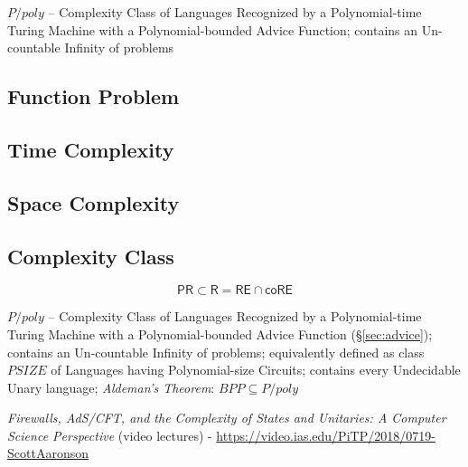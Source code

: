 $P/poly$ -- Complexity Class of Languages Recognized by a Polynomial-time Turing
Machine with a Polynomial-bounded Advice Function; contains an Un-countable
Infinity of problems



\subsection{Function Problem}\label{sec:function_problem}

\subsection{Time Complexity}\label{sec:time_complexity}

\subsection{Space Complexity}\label{sec:space_complexity}

\subsection{Complexity Class}\label{sec:complexity_class}

\[
  \mathsf{PR} \subset \mathsf{R} = \mathsf{RE} \cap \mathsf{coRE}
\]

$P/poly$ -- Complexity Class of Languages Recognized by a Polynomial-time Turing
Machine with a Polynomial-bounded Advice Function (\S\ref{sec:advice}); contains
an Un-countable Infinity of problems; equivalently defined as class $PSIZE$ of
Languages having Polynomial-size Circuits; contains every Undecidable Unary
language; \emph{Aldeman's Theorem}: $BPP \subseteq P/poly$

\emph{Firewalls, AdS/CFT, and the Complexity of States and Unitaries: A Computer
  Science Perspective}
(video lectures)
-
\url{https://video.ias.edu/PiTP/2018/0719-ScottAaronson}

